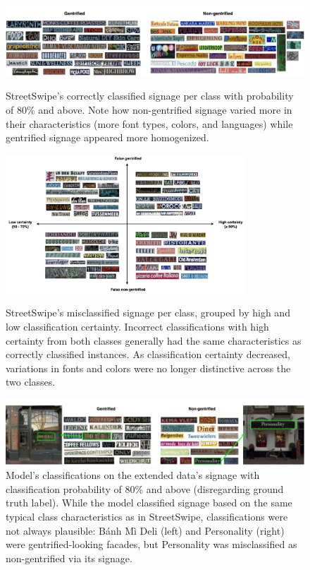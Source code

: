 \begin{figure}[hbtp]
    \centering
    \includegraphics[width=\textwidth]{media/results/output_vis-SS_correct1.jpg}
        \caption{StreetSwipe's correctly classified signage per class with probability of 80\% and above. Note how non-gentrified signage varied more in their characteristics (more font types, colors, and languages) while gentrified signage appeared more homogenized.}
        \label{fig:output_vis}
    \vspace{0.5cm}
    \includegraphics[width=0.8\textwidth]{media/results/output_vis-SS_incorrect.jpg}
        \caption{StreetSwipe's misclassified signage per class, grouped by high and low classification certainty. Incorrect classifications with high certainty from both classes generally had the same characteristics as correctly classified instances. As classification certainty decreased, variations in fonts and colors were no longer distinctive across the two classes.}
        \label{fig:output_vis_SS_incorrect}
    \vspace{0.6cm}
    \includegraphics[width=\textwidth]{media/results/output_vis_pano.jpg}
        \caption{Model's classifications on the extended data's signage with classification probability of 80\% and above (disregarding ground truth label). While the model classified signage based on the same typical class characteristics as in StreetSwipe, classifications were not always plausible: Bánh Mì Deli (left) and Personality (right) were gentrified-looking facades, but Personality was misclassified as non-gentrified via its signage.}
        \label{fig:output_vis_pano}
\end{figure}
